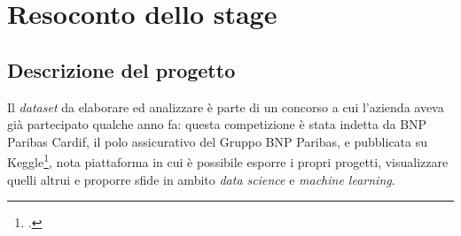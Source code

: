 


\chapter{Resoconto dello stage}
\label{cap:resoconto-stage}

\section{Descrizione del progetto}
Il \textit{dataset} da elaborare ed analizzare è parte di un concorso a cui l'azienda aveva già partecipato qualche anno fa: questa competizione è stata indetta da BNP Paribas Cardif, il polo assicurativo del Gruppo BNP Paribas, e pubblicata su Keggle\footcite{https://www.kaggle.com/}, nota piattaforma in cui è possibile esporre i propri progetti, visualizzare quelli altrui e proporre sfide in ambito \textit{data science} e \textit{machine learning}.

